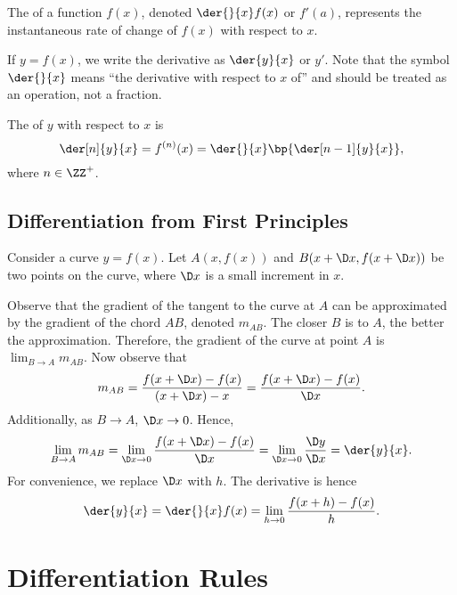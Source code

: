 \begin{definition}
    The  of a function $f(x)$, denoted $\der{}{x} f(x)$ or $f'(a)$, represents the instantaneous rate of change of $f(x)$ with respect to $x$.
\end{definition}

If $y = f(x)$, we write the derivative as $\der{y}{x}$ or $y'$. Note that the symbol $\der{}{x}$ means ``the derivative with respect to $x$ of'' and should be treated as an operation, not a fraction.

\begin{definition}
    The  of $y$ with respect to $x$ is \[\der[n]{y}{x} = f^{(n)}(x) = \der{}{x} \bp{\der[n-1]{y}{x}},\] where $n \in \ZZ^+$.
\end{definition}

\subsection{Differentiation from First Principles}

Consider a curve $y = f(x)$. Let $A(x, f(x))$ and $B(x + \D x, f(x + \D x))$ be two points on the curve, where $\D x$ is a small increment in $x$.

Observe that the gradient of the tangent to the curve at $A$ can be approximated by the gradient of the chord $AB$, denoted $m_{AB}$. The closer $B$ is to $A$, the better the approximation. Therefore, the gradient of the curve at point $A$ is $\lim_{B \to A} m_{AB}$. Now observe that \[m_{AB} = \frac{f(x + \D x) - f(x)}{(x + \D x) - x} = \frac{f(x + \D x) - f(x)}{\D x}.\] Additionally, as $B \to A$, $\D x \to 0$. Hence, \[\lim_{B \to A} m_{AB} = \lim_{\D x \to 0} \frac{f(x + \D x) - f(x)}{\D x} = \lim_{\D x \to 0} \frac{\D y}{\D x} = \der{y}{x}.\] For convenience, we replace $\D x$ with $h$. The derivative is hence \[\der{y}{x} = \der{}{x} f(x) = \lim_{h \to 0} \frac{f(x+h) - f(x)}{h}.\]

\section{Differentiation Rules}


